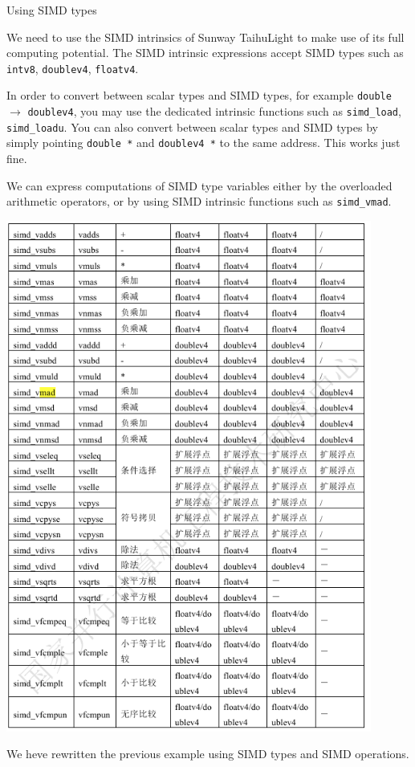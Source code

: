 Using SIMD types

We need to use the SIMD intrinsics of Sunway TaihuLight to make use of its full computing potential.
The SIMD intrinsic expressions accept SIMD types such as
\verb`intv8`,
\verb`doublev4`,
\verb`floatv4`.

In order to convert between scalar types and SIMD types, for example
\verb`double` $\to$ \verb`doublev4`, you may use the dedicated intrinsic functions such as
 \verb`simd_load`,  \verb`simd_loadu`.
You can also
convert between scalar types and SIMD types by
simply pointing \verb`double *` and  \verb`doublev4 *` to the same address. This works just fine.

We can express
computations of
SIMD type variables either by the overloaded arithmetic operators, or by using SIMD intrinsic functions such as
\verb`simd_vmad`.
\begin{center}
  \includegraphics[width=12cm]{figure/sunway-simd.png}
  \end{center}


We heve rewritten the previous example using
SIMD types and SIMD operations.
